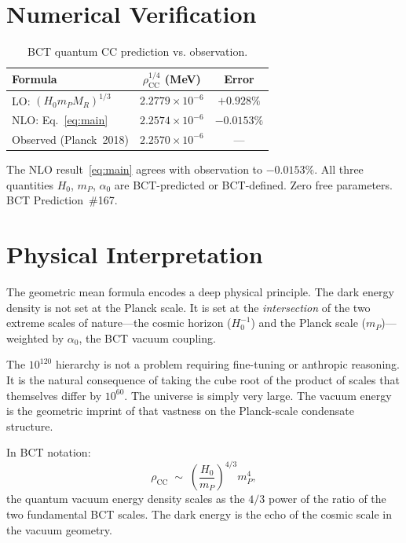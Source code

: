 \documentclass[aps,prl,twocolumn,showpacs,preprintnumbers]{revtex4-2}
\newcommand{\azero}{\alpha_0}
\newcommand{\mP}{m_P}
\newcommand{\MR}{M_R}
\newcommand{\rhoCC}{\rho_{\mathrm{CC}}}
\newcommand{\Hzero}{H_0}
\begin{document}
\section{Numerical Verification}

\begin{table}[h]
\centering
\caption{BCT quantum CC prediction vs. observation.}
\label{tab:result}
\begin{tabular}{lcc}
\toprule
Formula & $\rhoCC^{1/4}$ (MeV) & Error \\
\midrule
LO: $(\Hzero\mP\MR)^{1/3}$                    & $2.2779\times10^{-6}$ & $+0.928\%$ \\
NLO: Eq.~\eqref{eq:main}                       & $2.2574\times10^{-6}$ & $\mathbf{-0.0153\%}$ \\
\midrule
Observed (Planck~2018)                          & $2.2570\times10^{-6}$ & --- \\
\bottomrule
\end{tabular}
\end{table}

The NLO result~\eqref{eq:main} agrees with observation to $-0.0153\%$.
All three quantities $\Hzero$, $\mP$, $\azero$ are BCT-predicted or
BCT-defined. Zero free parameters. BCT Prediction~\#167.

\section{Physical Interpretation}

The geometric mean formula encodes a deep physical principle. The dark energy
density is not set at the Planck scale. It is set at the \emph{intersection}
of the two extreme scales of nature---the cosmic horizon ($\Hzero^{-1}$)
and the Planck scale ($\mP$)---weighted by $\azero$, the BCT vacuum coupling.

The $10^{120}$ hierarchy is not a problem requiring fine-tuning or
anthropic reasoning. It is the natural consequence of taking the cube root
of the product of scales that themselves differ by $10^{60}$. The universe
is simply very large. The vacuum energy is the geometric imprint of that
vastness on the Planck-scale condensate structure.

In BCT notation:
\begin{equation}
  \rhoCC \;\sim\; \left(\frac{\Hzero}{\mP}\right)^{4/3} \mP^4,
\end{equation}
the quantum vacuum energy density scales as the $4/3$ power of the ratio
of the two fundamental BCT scales. The dark energy is the echo of the cosmic
scale in the vacuum geometry.
\end{document}
